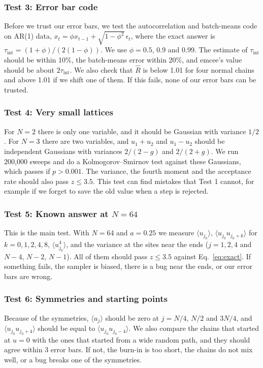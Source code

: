 \documentclass[11pt]{article}
\begin{document}
\subsubsection*{Test 3: Error bar code}
Before we trust our error bars, we test the autocorrelation and batch-means code on AR(1) data, $x_t = \phi x_{t-1} + \sqrt{1-\phi^2}\,\epsilon_t$, where the exact answer is $\tau_{\text{int}} = (1+\phi)/(2(1-\phi))$. We use $\phi = 0.5$, 0.9 and 0.99. The estimate of $\tau_{\text{int}}$ should be within 10\%, the batch-means error within 20\%, and emcee's value should be about $2\tau_{\text{int}}$. We also check that $\hat R$ is below 1.01 for four normal chains and above 1.01 if we shift one of them. If this fails, none of our error bars can be trusted.

\subsubsection*{Test 4: Very small lattices}
For $N = 2$ there is only one variable, and it should be Gaussian with variance $1/2$. For $N = 3$ there are two variables, and $u_1+u_2$ and $u_1-u_2$ should be independent Gaussians with variances $2/(2-g)$ and $2/(2+g)$. We run 200,000 sweeps and do a Kolmogorov--Smirnov test against these Gaussians, which passes if $p > 0.001$. The variance, the fourth moment and the acceptance rate should also pass $z \le 3.5$. This test can find mistakes that Test 1 cannot, for example if we forget to save the old value when a step is rejected.

\subsubsection*{Test 5: Known answer at $N = 64$}
This is the main test. With $N = 64$ and $a = 0.25$ we measure $\langle u_{j_0}\rangle$, $\langle u_{j_0}u_{j_0+k}\rangle$ for $k = 0, 1, 2, 4, 8$, $\langle u_{j_0}^4\rangle$, and the variance at the sites near the ends ($j = 1, 2, 4$ and $N-4$, $N-2$, $N-1$). All of them should pass $z \le 3.5$ against Eq.~\eqref{eq:exact}. If something fails, the sampler is biased, there is a bug near the ends, or our error bars are wrong.

\subsubsection*{Test 6: Symmetries and starting points}
Because of the symmetries, $\langle u_j\rangle$ should be zero at $j = N/4$, $N/2$ and $3N/4$, and $\langle u_{j_0}u_{j_0+4}\rangle$ should be equal to $\langle u_{j_0}u_{j_0-4}\rangle$. We also compare the chains that started at $u = 0$ with the ones that started from a wide random path, and they should agree within 3 error bars. If not, the burn-in is too short, the chains do not mix well, or a bug breaks one of the symmetries.
\end{document}
